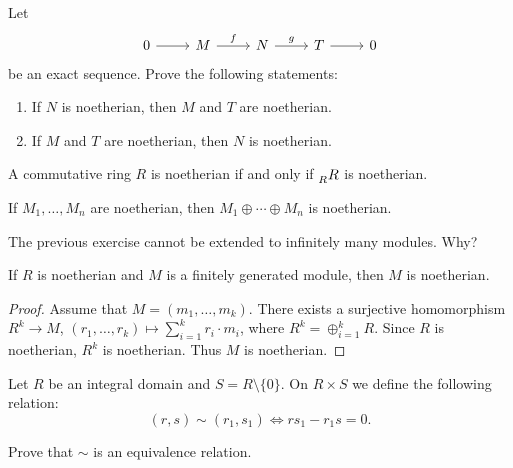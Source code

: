 \begin{exercise}
\label{xca:exacta_noetheriano}
	Let   
\[\begin{tikzcd}
	0 & M & N & T & 0
	\arrow[from=1-1, to=1-2]
	\arrow["f", from=1-2, to=1-3]
	\arrow["g", from=1-3, to=1-4]
	\arrow[from=1-4, to=1-5]
\end{tikzcd}
\]
     be an exact sequence. Prove the following statements:
     \begin{enumerate}
     	\item If $N$ is noetherian, then $M$ and $T$ are noetherian.
     	\item If $M$ and $T$ are noetherian, then $N$ is noetherian.
     \end{enumerate}	
\end{exercise}

\begin{exercise}
\label{xca:regular_noetheriano}
A commutative ring $R$ is noetherian if and only if $\prescript{}{R}R$ is noetherian.	
\end{exercise}

\begin{exercise}
\label{xca:directa_noetheriano}
If $M_1,\dots,M_n$ are noetherian, then $M_1\oplus\cdots\oplus M_n$ is noetherian. 	
\end{exercise}

The previous exercise cannot be extended to infinitely many modules. Why?

\begin{proposition}
If $R$ is noetherian and $M$ is a finitely generated module, then $M$ is noetherian. 
\end{proposition}

\begin{proof}
    Assume that $M=(m_1,\dots,m_k)$. There exists a surjective homomorphism  
$R^k\to M$, $(r_1,\dots,r_k)\mapsto \sum_{i=1}^k r_i\cdot m_i$, where
$R^k=\oplus_{i=1}^k R$. Since $R$ is noetherian, $R^k$ is noetherian. Thus $M$ is noetherian.	
\end{proof}


Let $R$ be an integral domain and $S=R\setminus\{0\}$. 
On $R\times S$ we define the following relation:
\[
(r,s)\sim (r_1,s_1)\Longleftrightarrow rs_1-r_1s=0.
\]

\begin{exercise}
Prove that $\sim$ is an equivalence relation.
\end{exercise}

